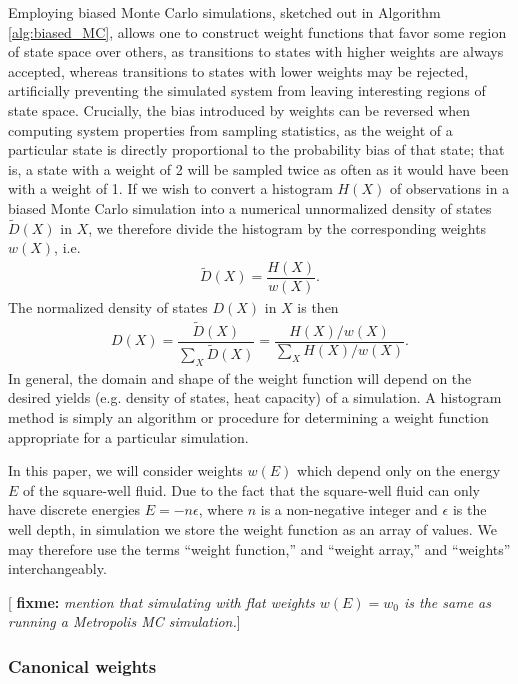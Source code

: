 \documentclass[11pt]{article}
\newcommand{\f}[2]{\dfrac{#1}{#2}} %
\newcommand{\p}[1]{\left(#1\right)} %
\newcommand{\red}[1]{{\bf \color{red} #1}}
\newcommand{\fixme}[1]{[\red{fixme:} \emph{#1}]}
\begin{document}
Employing biased Monte Carlo simulations, sketched out in Algorithm
\ref{alg:biased_MC}, allows one to construct weight functions that
favor some region of state space over others, as transitions to states
with higher weights are always accepted, whereas transitions to states
with lower weights may be rejected, artificially preventing the
simulated system from leaving interesting regions of state
space. Crucially, the bias introduced by weights can be reversed when
computing system properties from sampling statistics, as the weight of
a particular state is directly proportional to the probability bias of
that state; that is, a state with a weight of 2 will be sampled twice
as often as it would have been with a weight of 1. If we wish to
convert a histogram $H\p{X}$ of observations in a biased Monte Carlo
simulation into a numerical unnormalized density of states $\tilde
D\p{X}$ in $X$, we therefore divide the histogram by the corresponding
weights $w\p{X}$, i.e.
\begin{align}
  \tilde D\p{X}=\f{H\p{X}}{w\p{X}}.
  \label{eq:dos}
\end{align}
The normalized density of states $D\p{X}$ in $X$ is then
\begin{align}
  D\p{X}=\f{\tilde D\p{X}}{\sum_X\tilde D\p{X}}
  =\f{H\p{X}/w\p{X}}{\sum_XH\p{X}/w\p{X}}.
  \label{eq:dos_norm}
\end{align}
In general, the domain and shape of the weight function will depend on
the desired yields (e.g.  density of states, heat capacity) of a
simulation. A histogram method is simply an algorithm or procedure for
determining a weight function appropriate for a particular simulation.

In this paper, we will consider weights $w\p{E}$ which depend only on
the energy $E$ of the square-well fluid. Due to the fact that the
square-well fluid can only have discrete energies $E=-n\epsilon$,
where $n$ is a non-negative integer and $\epsilon$ is the well depth,
in simulation we store the weight function as an array of values. We
may therefore use the terms ``weight function,'' and ``weight array,''
and ``weights'' interchangeably.

\fixme{mention that simulating with flat weights $w\p{E}=w_0$ is the
  same as running a Metropolis MC simulation.}

\subsubsection{Canonical weights}
\label{sec:canonical_weights}
\end{document}
